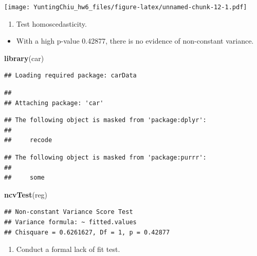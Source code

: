 \documentclass[
]{article}
\newenvironment{Shaded}{\begin{snugshade}}{\end{snugshade}}
\newcommand{\KeywordTok}[1]{\textcolor[rgb]{0.13,0.29,0.53}{\textbf{#1}}}
\newcommand{\NormalTok}[1]{#1}
\providecommand{\tightlist}{%
  \setlength{\itemsep}{0pt}\setlength{\parskip}{0pt}}
\begin{document}
\texttt{[image: YuntingChiu\_hw6\_files/figure-latex/unnamed-chunk-12-1.pdf]}

\begin{enumerate}
\def\labelenumi{(\alph{enumi})}
\setcounter{enumi}{2}
\tightlist
\item
  Test homoscedasticity.
\end{enumerate}

\begin{itemize}
\tightlist
\item
  With a high p-value 0.42877, there is no evidence of non-constant
  variance.
\end{itemize}

\begin{Shaded}
\begin{Highlighting}[]
\KeywordTok{library}\NormalTok{(car)}
\end{Highlighting}
\end{Shaded}

\begin{verbatim}
## Loading required package: carData
\end{verbatim}

\begin{verbatim}
## 
## Attaching package: 'car'
\end{verbatim}

\begin{verbatim}
## The following object is masked from 'package:dplyr':
## 
##     recode
\end{verbatim}

\begin{verbatim}
## The following object is masked from 'package:purrr':
## 
##     some
\end{verbatim}

\begin{Shaded}
\begin{Highlighting}[]
\KeywordTok{ncvTest}\NormalTok{(reg)}
\end{Highlighting}
\end{Shaded}

\begin{verbatim}
## Non-constant Variance Score Test 
## Variance formula: ~ fitted.values 
## Chisquare = 0.6261627, Df = 1, p = 0.42877
\end{verbatim}

\begin{enumerate}
\def\labelenumi{(\alph{enumi})}
\setcounter{enumi}{3}
\tightlist
\item
  Conduct a formal lack of fit test.
\end{enumerate}
\end{document}
